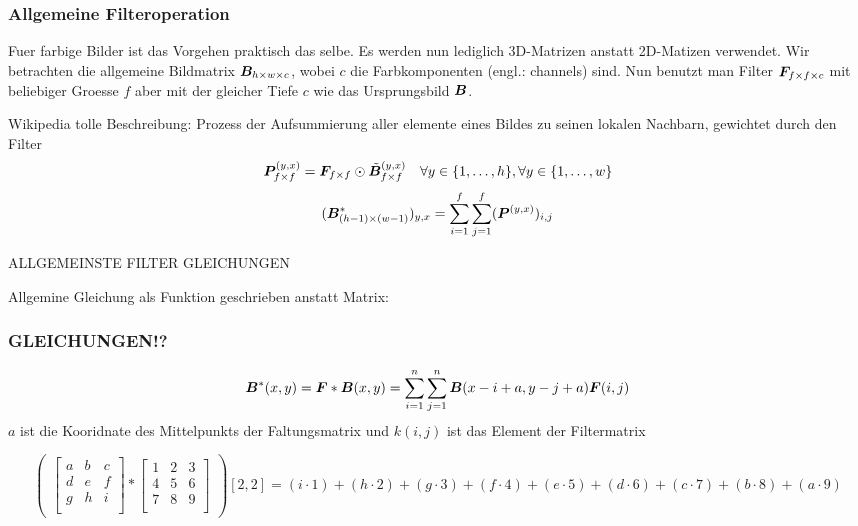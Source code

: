 \subsubsection{Allgemeine Filteroperation}
Fuer farbige Bilder ist das Vorgehen praktisch das selbe. Es werden nun
lediglich 3D-Matrizen anstatt 2D-Matizen verwendet. Wir betrachten die
allgemeine Bildmatrix $\bm{B}_{h \times w \times c}$, wobei $c$ die
Farbkomponenten (engl.: channels) sind.
Nun benutzt man Filter $\bm{F}_{f \times f \times c}$ mit beliebiger Groesse
$f$ aber mit der gleicher Tiefe $c$ wie das Ursprungsbild $\bm{B}$.

Wikipedia tolle Beschreibung: Prozess der Aufsummierung aller elemente eines
Bildes zu seinen lokalen Nachbarn, gewichtet durch den Filter
\begin{equation}
  \bm{P}^{(y,x)}_{f \times f} = \bm{F}_{f \times f} \odot \tilde{\bm{B}}^{(y,x)}_{f \times f} \quad \forall y \in \{1,\ldots,h\}, \forall y \in \{1,\ldots,w\}
\end{equation}
\begin{equation}
  (\bm{B}_{(h-1) \times (w-1)}^*)_{y,x} = \sum_{i=1}^f \sum_{j=1}^f (\bm{P}^{(y,x)})_{i,j}
\end{equation}

ALLGEMEINSTE FILTER GLEICHUNGEN

Allgemine Gleichung als Funktion geschrieben anstatt Matrix:



\subsubsection{GLEICHUNGEN!?}
\begin{equation}
  \bm{B}^*(x,y) = \bm{F} * \bm{B}(x,y) = \sum_{i=1}^n \sum_{j=1}^n \bm{B}(x-i+a, y-j+a)\bm{F}(i,j)
\end{equation}
$a$ ist die Kooridnate des Mittelpunkts der Faltungsmatrix und $k(i,j)$ ist das
Element der Filtermatrix

\begin{equation}
  \begin{pmatrix}
    \begin{bmatrix}
      a & b & c \\
      d & e & f \\
      g & h & i \\
    \end{bmatrix}
    *
    \begin{bmatrix}
      1 & 2 & 3 \\
      4 & 5 & 6 \\
      7 & 8 & 9 \\
    \end{bmatrix}
  \end{pmatrix}
  [2,2]
  = (i \cdot 1) + (h \cdot 2) + (g \cdot 3) + (f \cdot 4) + (e \cdot 5) + (d \cdot 6) + (c \cdot 7) + (b \cdot 8) + (a \cdot 9)
\end{equation}


